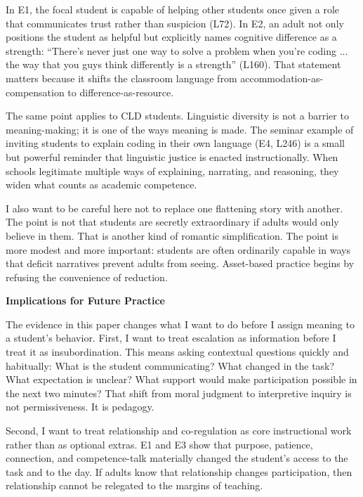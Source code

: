 \documentclass[12pt]{article}
\newcommand{\levelone}[1]{\begin{center}\textbf{#1}\end{center}}
\newcommand{\EvidenceSet}[1]{\textsc{E#1}}
\begin{document}
In \EvidenceSet{1}, the focal student is capable of helping other students once given a role that communicates trust rather than suspicion (L72). In \EvidenceSet{2}, an adult not only positions the student as helpful but explicitly names cognitive difference as a strength: ``There's never just one way to solve a problem when you're coding ... the way that you guys think differently is a strength'' (L160). That statement matters because it shifts the classroom language from accommodation-as-compensation to difference-as-resource.

The same point applies to CLD students. Linguistic diversity is not a barrier to meaning-making; it is one of the ways meaning is made. The seminar example of inviting students to explain coding in their own language (\EvidenceSet{4}, L246) is a small but powerful reminder that linguistic justice is enacted instructionally. When schools legitimate multiple ways of explaining, narrating, and reasoning, they widen what counts as academic competence.

I also want to be careful here not to replace one flattening story with another. The point is not that students are secretly extraordinary if adults would only believe in them. That is another kind of romantic simplification. The point is more modest and more important: students are often ordinarily capable in ways that deficit narratives prevent adults from seeing. Asset-based practice begins by refusing the convenience of reduction.

\levelone{Implications for Future Practice}

The evidence in this paper changes what I want to do before I assign meaning to a student's behavior. First, I want to treat escalation as information before I treat it as insubordination. This means asking contextual questions quickly and habitually: What is the student communicating? What changed in the task? What expectation is unclear? What support would make participation possible in the next two minutes? That shift from moral judgment to interpretive inquiry is not permissiveness. It is pedagogy.

Second, I want to treat relationship and co-regulation as core instructional work rather than as optional extras. \EvidenceSet{1} and \EvidenceSet{3} show that purpose, patience, connection, and competence-talk materially changed the student's access to the task and to the day. If adults know that relationship changes participation, then relationship cannot be relegated to the margins of teaching.
\end{document}
